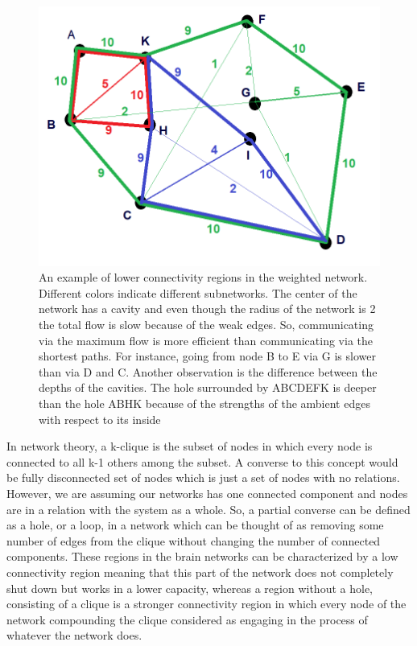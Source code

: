 \documentclass[9pt,twocolumn,twoside,lineno]{pnas-new}
\begin{document}
\begin{figure}%
\centering
\includegraphics[width=.8\linewidth]{lowwerconnectivity.png}
\caption{An example of lower connectivity regions in the weighted network. Different colors indicate different subnetworks. The center of the network has a cavity and even though the radius of the network is 2 the total flow is slow because of the weak edges. So, communicating via the maximum flow is more efficient than communicating via the shortest paths. For instance, going from node B to E via G is slower than via D and C. Another observation is the difference between the depths of the cavities. The hole surrounded by ABCDEFK is deeper than the hole ABHK because of the strengths of the ambient edges with respect to its inside}
\label{fig:connectivty}
\end{figure}



  In network theory, a k-clique is the subset of nodes in which every node is connected to all k-1 others among the subset. A converse to this concept would be fully disconnected set of nodes which is just a set of nodes with no relations. However, we are assuming our networks has one connected component and nodes are in a relation with the system as a whole. So, a partial converse can be defined as a hole, or a loop, in a network which can be thought of as removing some number of edges from the clique without changing the number of connected components. These regions in the brain networks can be characterized by a low connectivity region meaning that this part of the network does not completely shut down but works in a lower capacity, whereas a region without a hole, consisting of a clique is a stronger connectivity region in which every node of the network compounding the clique considered as engaging in the process of whatever the network does.
\end{document}
